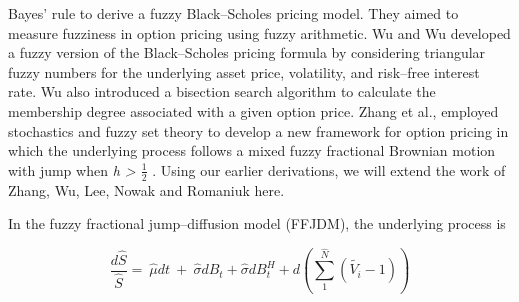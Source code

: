 \documentclass[12pt,a4paper]{report}
\numberwithin{equation}{section}
\begin{document}
Bayes' rule to derive a fuzzy Black--Scholes pricing model. They aimed to
measure fuzziness in option pricing using fuzzy arithmetic. Wu \cite{wu2004pricing_104}
and Wu \cite{wu2005european_105} developed a fuzzy version of the Black--Scholes pricing
formula by considering triangular fuzzy numbers for the underlying asset
price, volatility, and risk--free interest rate. Wu \cite{wu2007using_106} also
introduced a bisection search algorithm to calculate the membership
degree associated with a given option price. Zhang et al., employed
stochastics and fuzzy set theory to develop a new framework for option
pricing in which the underlying process follows a mixed fuzzy fractional
Brownian motion with jump when \emph{h \textgreater{} $\frac{1}{2}$} \cite{zhang2021pricing_92}. Using
our earlier derivations, we will extend the work of Zhang, Wu, Lee,
Nowak and Romaniuk here.

In the fuzzy fractional jump--diffusion model (FFJDM), the underlying
process is

\[\frac{d\widehat{S}}{\widehat{S}} = \ \widehat{\mu}dt\  + \ \widehat{\sigma}dB_{t} + \widehat{\sigma}dB_{t}^{H} + d\left( \sum_{1}^{\widehat{N}}\left( \widetilde{V_{i}} - 1 \right) \right)\]
\end{document}
